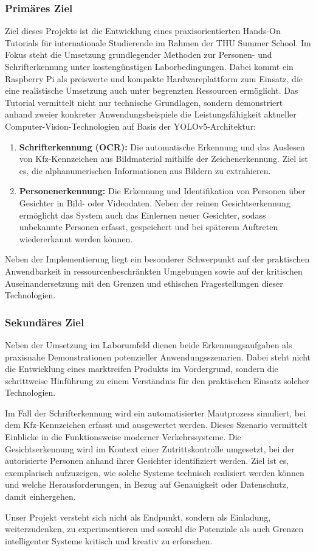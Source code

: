 \subsubsection{Primäres Ziel}Ziel dieses Projekts ist die Entwicklung eines praxisorientierten Hands-On Tutorials für internationale Studierende im Rahmen der THU Summer School. Im Fokus steht die Umsetzung grundlegender Methoden zur Personen- und Schrifterkennung unter kostengünstigen Laborbedingungen. Dabei kommt ein Raspberry Pi als preiswerte und kompakte Hardwareplattform zum Einsatz, die eine realistische Umsetzung auch unter begrenzten Ressourcen ermöglicht. 
Das Tutorial vermittelt nicht nur technische Grundlagen, sondern demonstriert anhand zweier konkreter Anwendungsbeispiele die Leistungsfähigkeit aktueller Computer-Vision-Technologien auf Basis der YOLOv5-Architektur:
\begin{enumerate}
    \item\textbf{Schrifterkennung (OCR):} Die automatische Erkennung und das Auslesen von Kfz-Kennzeichen aus Bildmaterial mithilfe der Zeichenerkennung. Ziel ist es, die alphanumerischen Informationen aus Bildern zu extrahieren.
    \item\textbf{Personenerkennung:} Die Erkennung und Identifikation von Personen über Gesichter in Bild- oder Videodaten. Neben der reinen Gesichtserkennung ermöglicht das System auch das Einlernen neuer Gesichter, sodass unbekannte Personen erfasst, gespeichert und bei späterem Auftreten wiedererkannt werden können.
\end{enumerate}
    Neben der Implementierung liegt ein besonderer Schwerpunkt auf der praktischen Anwendbarkeit in ressourcenbeschränkten Umgebungen sowie auf der kritischen Auseinandersetzung mit den Grenzen und ethischen Fragestellungen dieser Technologien. 
\subsubsection{Sekundäres Ziel}Neben der Umsetzung im Laborumfeld dienen beide Erkennungsaufgaben als praxisnahe Demonstrationen potenzieller Anwendungsszenarien. Dabei steht nicht die Entwicklung eines marktreifen Produkts im Vordergrund, sondern die schrittweise Hinführung zu einem Verständnis für den praktischen Einsatz solcher Technologien. 

Im Fall der Schrifterkennung wird ein automatisierter Mautprozess simuliert, bei dem Kfz-Kennzeichen erfasst und ausgewertet werden. Dieses Szenario vermittelt Einblicke in die Funktionsweise moderner Verkehrssysteme. 
Die Gesichtserkennung wird im Kontext einer Zutrittskontrolle umgesetzt, bei der autorisierte Personen anhand ihrer Gesichter identifiziert werden. Ziel ist es, exemplarisch aufzuzeigen, wie solche Systeme technisch realisiert werden können und welche Herausforderungen, in Bezug auf Genauigkeit oder Datenschutz, damit einhergehen. 

Unser Projekt versteht sich nicht als Endpunkt, sondern als Einladung, weiterzudenken, zu experimentieren und sowohl die Potenziale als auch Grenzen intelligenter Systeme kritisch und kreativ zu erforschen. 